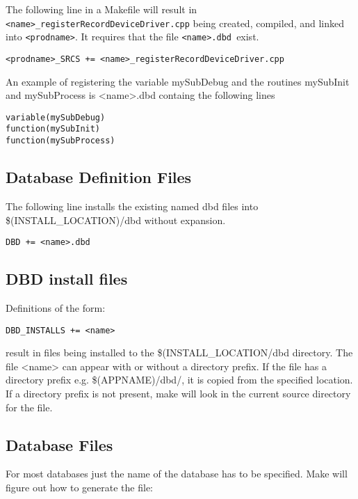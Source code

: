 The following line in a Makefile will result in \verb|<name>_registerRecordDeviceDriver.cpp| being created, 
compiled, and linked into \verb|<prodname>|. It requires that the file \verb|<name>.dbd |exist.

\begin{verbatim}<prodname>_SRCS += <name>_registerRecordDeviceDriver.cpp
\end{verbatim}An example of registering the variable mySubDebug and the routines mySubInit and mySubProcess is \textless{}name\textgreater{}.dbd 
containg the following lines

\begin{verbatim}variable(mySubDebug)
function(mySubInit)
function(mySubProcess)
\end{verbatim}\subsection{Database Definition Files}

The following line installs the existing named dbd files into \$(INSTALL\_LOCATION)/dbd without expansion.

\begin{verbatim}DBD += <name>.dbd
\end{verbatim}\subsection{DBD install files}

Definitions of the form:

\begin{verbatim}DBD_INSTALLS += <name>
\end{verbatim}result in files being installed to the \$(INSTALL\_LOCATION/dbd directory. The file \textless{}name\textgreater{} can appear with or without 
a directory prefix. If the file has a directory prefix e.g. \$(APPNAME)/dbd/, it is copied from the specified location. If a 
directory prefix is not present, make will look in the current source directory for the file.

\subsection{Database Files}

For most databases just the name of the database has to be specified. Make will figure out how to generate the file: 

